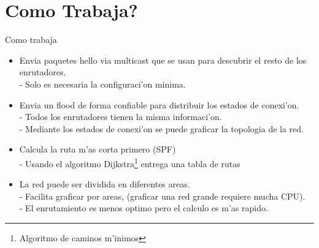 \documentclass[xcolor=dvipsnames]{beamer}
\begin{document}
\section{Como Trabaja?}		
	\begin{frame}{Como trabaja}
	\scriptsize
	{
	\begin{itemize}
		\item Envia paquetes hello via multicast que se usan para descubrir el resto de los enrutadores. \\ 
				- Solo es necesaria la configuraci'on minima.
		\item Envia un flood de forma confiable para distribuir los estados de conexi'on.\\
				- Todos los enrutadores tienen la misma informaci'on.\\
				- Mediante los estados de conexi'on se puede graficar la topologia de la red.\\
		
		\item Calcula la ruta m'as corta primero (SPF)\\
				- Usando el algoritmo Dijkstra\footnote{Algoritmo de caminos m'{i}nimos} entrega una tabla de rutas \\
		\item La red puede ser dividida en diferentes areas.\\
				- Facilita graficar por areas, (graficar una red grande requiere mucha CPU).\\
				- El enrutamiento es menos optimo pero el calculo es m'as rapido.\\
	\end{itemize}
	}
	\end{frame}	
\end{document}
